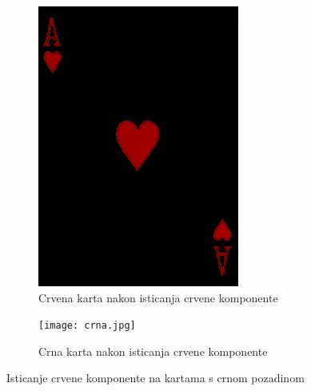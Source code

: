 \documentclass[times, zavrsni, numeric, utf8]{fer}
\begin{document}
\begin{figure}[H]
\begin{subfigure}{.5\textwidth}
  \centering
  \includegraphics[width=.778\linewidth]{crvena.jpg}
  \caption{Crvena karta nakon isticanja crvene komponente}
  \label{fig:crv}
\end{subfigure}%
\begin{subfigure}{.5\textwidth}
  \centering
  \texttt{[image: crna.jpg]}
  \caption{Crna karta nakon isticanja crvene komponente}
  \label{fig:crn}
\end{subfigure}
\caption{Isticanje crvene komponente na kartama s crnom pozadinom}
\label{fig:redness}
\end{figure} 
\end{document}
